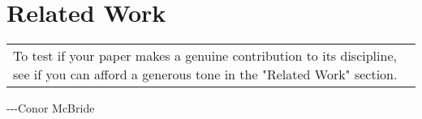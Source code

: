 \documentclass[12pt]{cmuthesis}
\begin{document}
\tableofcontents
\listoffigures
\listoftables

\mainmatter


%
%
%
%
%

\newcommand\simics{\textsc{Simics}}
\newcommand{\sect}[1]{\S #1}
\newcommand\hilight[2]{\color{#1}#2\color{black}}

\newtheorem{theorem}{Theorem}

\newcommand\llama[1]{\texttt{[image: llama.pdf]}}
\newcommand\llitem{\item[\llama{1.2em}]}

\newcommand{\inspirationallinebreak}{\vspace{0.25em}}
\newcommand{\inspirationalhyphen}{-\hspace{-0.15em}-\xspace}
\newcommand\inspirationalquote[2]{\begin{flushright}
	\vspace{-1em}
	{
	\fontspec[Path=./fonts/]{AlexaStd}
	{\em #1}
	\inspirationallinebreak

	-\hspace{-0.15em}-\hspace{-0.15em}-{#2}
	}
	\vspace{2em}
\end{flushright}}








\chapter{Related Work}
\label{chap:relatedwork}
\inspirationalquote{
\begin{tabular}{p{}}
To test if your paper makes a genuine contribution to its discipline,
see if you can afford a generous tone in the "Related Work" section.
\end{tabular}}
{Conor McBride}
\end{document}
